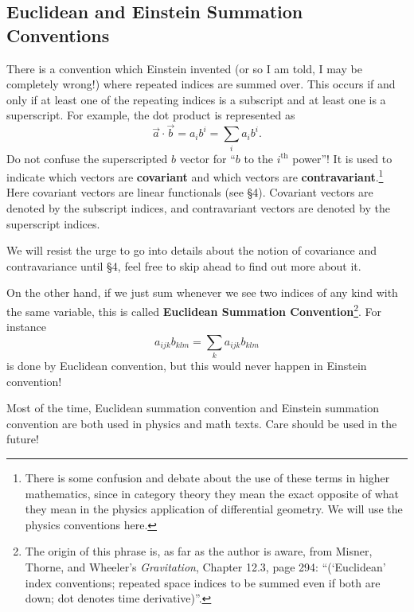 \subsection{Euclidean and Einstein Summation Conventions}

There is a convention which Einstein invented (or so I am told, I may be completely wrong!) where repeated indices are summed over. This occurs if and only if at least one of the repeating indices is a subscript and at least one is a superscript. For example, the dot product is represented as
\begin{equation}
\vec{a}\cdot\vec{b} = a_{i}b^{i} = \sum_{i}a_{i}b^{i}.
\end{equation}
Do not confuse the superscripted $b$ vector for ``$b$ to the $i^\textrm{th}$ power''! It is used to indicate which vectors are \textbf{covariant} and which vectors are \textbf{contravariant}.\footnote{There is some confusion and debate about the use of these terms in higher mathematics, since in category theory they mean the exact opposite of what they mean in the physics application of differential geometry. We will use the physics conventions here.} Here covariant vectors are linear functionals (see \S 4). Covariant vectors are denoted by the subscript indices, and contravariant vectors are denoted by the superscript indices.

We will resist the urge to go into details about the notion of covariance and contravariance until \S 4, feel free to skip ahead to find out more about it.

On the other hand, if we just sum whenever we see two indices of any kind with the same variable, this is called \textbf{Euclidean Summation Convention}\footnote{The origin of this phrase is, as far as the author is aware, from Misner, Thorne, and Wheeler's \emph{Gravitation}, Chapter 12.3, page 294: ``(`Euclidean' index conventions; repeated space indices to be summed even if both are down; dot denotes time derivative)''.}. For instance
\begin{equation}
a_{ijk}b_{klm} = \sum_{k}a_{ijk}b_{klm}
\end{equation}
is done by Euclidean convention, but this would never happen in Einstein convention!

\begin{rmk}
Most of the time, Euclidean summation convention and Einstein summation convention are both used in physics and math texts. Care should be used in the future!
\end{rmk}

